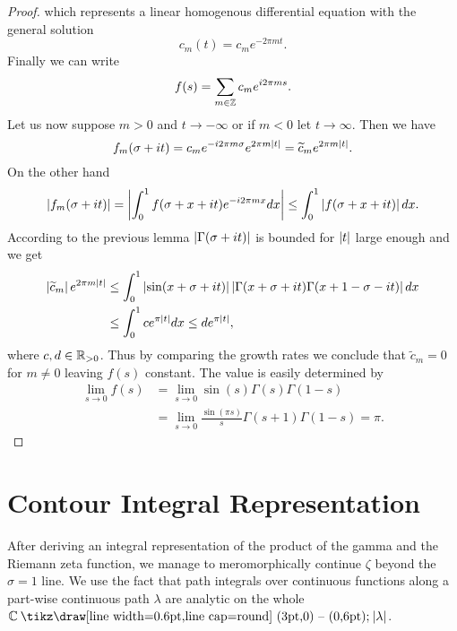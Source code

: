 \begin{proof}
	which represents a linear homogenous differential equation with the general solution
\begin{equation*}
	c_m(t) = c_m e^{-2 \pi m t}.
\end{equation*}
	Finally we can write
\begin{equation*}
	f(s) = \sum _{m \in \mathbb{Z}} c_m e^{i 2 \pi m s}.
\end{equation*}
	Let us now suppose $m > 0$ and $t \to -\infty$ or if $m < 0$ let $t \to \infty$. Then we have
\begin{equation*}
	f_m(\sigma + i t) = c_m e^{-i 2 \pi m \sigma} e^{2 \pi m \left|t\right|} = \widetilde{c}_m e^{2 \pi m \left|t\right|}.
\end{equation*}
	On the other hand
\begin{equation*}
	\left|f_m(\sigma + i t)\right| = \left|\int _0 ^1 f(\sigma + x + i t) e^{- i 2 \pi m x} dx\right| \leq \int _0 ^1 \left|f(\sigma + x + i t)\right| dx.
\end{equation*}
	According to the previous lemma  $\left|\Gamma(\sigma + i t)\right|$ is bounded for $\left|t\right|$ large enough and we get
\begin{equation*}
\begin{aligned}
	\left|\widetilde{c}_m\right| e^{2 \pi m \left|t\right|}
	&\leq \int_0^1 \left|\sin(x + \sigma + i t)\right| \left|\Gamma(x + \sigma + i t) \Gamma(x + 1 - \sigma - i t)\right| dx \\
	&\leq \int_0^1 c e^{\pi \left|t\right|} dx
	\leq d e^{\pi \left|t\right|},
\end{aligned}
\end{equation*}
	where $c,d \in \mathbb{R}_{> 0}$. Thus by comparing the growth rates we conclude that $\widetilde{c}_m = 0$ for $m \neq 0$ leaving $f(s)$ constant. The value is easily determined by
\begin{equation*}
\begin{aligned}
	\lim\limits_{s \to 0} f(s)
	&= \lim\limits_{s \to 0} \sin(s) \Gamma(s) \Gamma(1 - s) \\
	&= \lim\limits_{s \to 0} \frac{\sin(\pi s)}{s} \Gamma(s + 1) \Gamma(1 - s)
	= \pi.
\end{aligned}	
\end{equation*}
\end{proof}


\section{Contour Integral Representation}
After deriving an integral representation of the product of the gamma and the Riemann zeta function, we manage to meromorphically continue $\zeta$ beyond the $\sigma = 1$ line. We use the fact that path integrals over continuous functions along a part-wise continuous path $\lambda$ are analytic on the whole $\field{C} \mysetminus \abs{\lambda}$.


